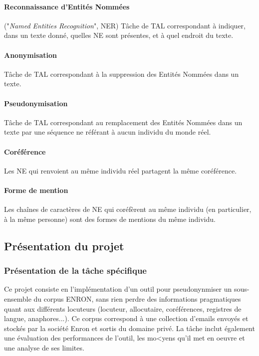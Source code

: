\documentclass{article}
\begin{document}
\paragraph{Reconnaissance d'Entités Nommées} ("\textit{Named Entities Recognition}", NER) Tâche de TAL correspondant à indiquer, dans un texte donné, quelles NE sont présentes, et à quel endroit du texte.
\paragraph{Anonymisation} Tâche de TAL correspondant à la suppression des Entités Nommées dans un texte.
\paragraph{Pseudonymisation} Tâche de TAL correspondant au remplacement des Entités Nommées dans un texte par une séquence ne référant à aucun individu du monde réel.
\paragraph{Coréférence} Les NE qui renvoient au même individu réel partagent la même coréférence. 
\paragraph{Forme de mention} Les chaînes de caractères de NE qui coréfèrent au même individu (en particulier, à la même personne) sont des formes de mentions du même individu.

\subsection{Présentation du projet}
\subsubsection{Présentation de la tâche spécifique}
\par
Ce projet consiste en l'implémentation d'un outil pour pseudonynmiser un sous-ensemble du corpus ENRON, sans rien perdre des informations pragmatiques quant aux différents locuteurs (locuteur, allocutaire, coréférences, registres de langue, anaphores...).
Ce corpus correspond à une collection d'emails envoyés et stockés par la société Enron et sortis du domaine privé.
La tâche inclut également une évaluation des performances de l'outil, les mo<yens qu'il met en oeuvre et une analyse de ses limites.
\end{document}
